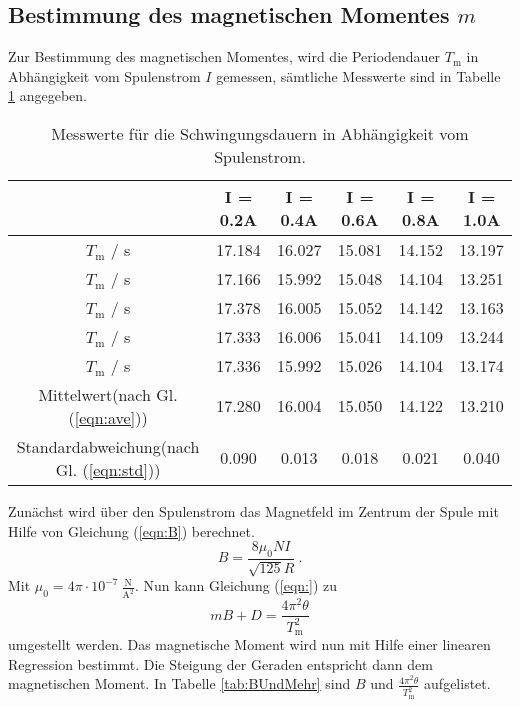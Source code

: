\subsection{Bestimmung des magnetischen Momentes $m$}
Zur Bestimmung des magnetischen Momentes, wird die Periodendauer $T_\text{m}$ in Abhängigkeit vom Spulenstrom $I$ gemessen, sämtliche Messwerte sind in Tabelle \ref{tab:Periodendauer3} angegeben.

\begin{table}[H] %
  \centering
  \begin{tabular}{c | c | c | c | c | c}
    & I = 0.2A & I = 0.4A & I = 0.6A & I = 0.8A & I = 1.0A \\
    \midrule
    $T_\text{m}$ / s & 17.184 & 16.027 & 15.081 & 14.152 & 13.197 \\
    $T_\text{m}$ / s & 17.166 & 15.992 & 15.048 & 14.104 & 13.251 \\
    $T_\text{m}$ / s & 17.378 & 16.005 & 15.052 & 14.142 & 13.163 \\
    $T_\text{m}$ / s & 17.333 & 16.006 & 15.041 & 14.109 & 13.244 \\
    $T_\text{m}$ / s & 17.336 & 15.992 & 15.026 & 14.104 & 13.174 \\
    \bottomrule
    Mittelwert(nach Gl. (\ref{eqn:ave})) & 17.280 & 16.004 & 15.050 & 14.122 & 13.210 \\
    Standardabweichung(nach Gl. (\ref{eqn:std})) & 0.090 & 0.013 & 0.018 & 0.021 & 0.040 \\
    \bottomrule
  \end{tabular}
  \caption{Messwerte für die Schwingungsdauern in Abhängigkeit vom Spulenstrom.}
  \label{tab:Periodendauer3}
\end{table}

Zunächst wird über den Spulenstrom das Magnetfeld im Zentrum der Spule mit Hilfe von Gleichung (\ref{eqn:B}) berechnet.
\begin{equation}
  B = \frac{8 \mu_0 N I}{\sqrt{125}R} \ .
  \label{eqn:B}
\end{equation}
Mit $\mu_0 = 4 \pi \cdot 10^{-7} \ \frac{\text{N}}{\text{A}^2}$.
Nun kann Gleichung (\ref{eqn:}) zu
\begin{equation}
  mB + D = \frac{4 \pi^2 \theta}{T_\text{m}^2}
\end{equation}
umgestellt werden. Das magnetische Moment wird nun mit Hilfe einer linearen Regression bestimmt. Die Steigung der Geraden entspricht dann dem magnetischen Moment. In Tabelle \ref{tab:BUndMehr} sind $B$ und $\frac{4 \pi^2 \theta}{T_\text{m}^2}$ aufgelistet.

